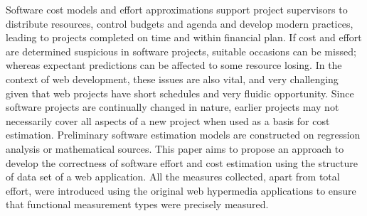Software cost models and effort approximations support project supervisors to distribute resources, control budgets
and agenda and develop modern practices, leading to projects completed on time and within financial plan. If cost and effort are determined suspicious in software projects, suitable occasions can be missed; whereas expectant predictions can be affected to some resource losing. In the context of web development, these issues are also vital, and very challenging given that web projects have short schedules and very fluidic opportunity. Since software projects are continually changed in nature, earlier projects may not necessarily cover all aspects of a new project when used
as a basis for cost estimation. Preliminary software estimation models are constructed on regression analysis or mathematical sources. This paper aims to propose an approach to develop the correctness of software effort and cost estimation using the structure of data set of a web application. All the measures collected, apart from total effort, were introduced using the original web hypermedia applications to ensure that functional measurement types were precisely measured. 